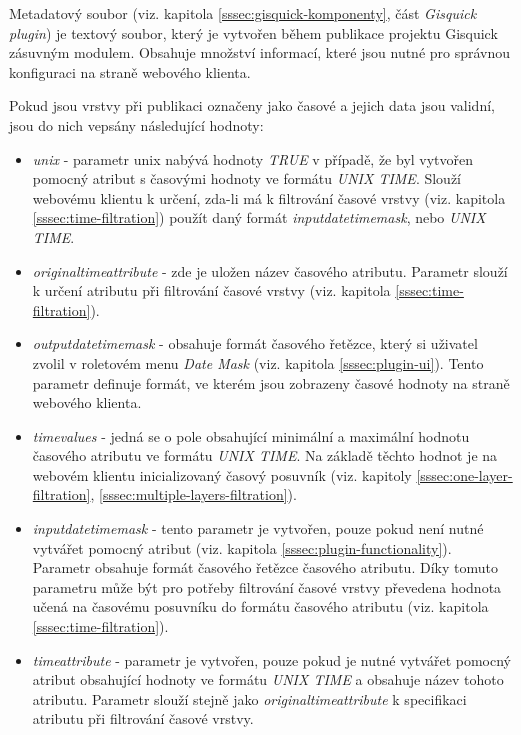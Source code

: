 Metadatový soubor (viz. kapitola \ref{sssec:gisquick-komponenty}, část
\textit{Gisquick plugin}) je textový soubor, který je vytvořen během publikace
projektu Gisquick zásuvným modulem. Obsahuje množství informací, které jsou
nutné pro správnou konfiguraci na straně webového klienta.

Pokud jsou vrstvy při publikaci označeny jako časové a jejich data jsou
validní, jsou do nich vepsány následující hodnoty:

\begin{itemize}
\item\textit{unix} - parametr unix nabývá hodnoty \textit{TRUE}
v případě, že byl vytvořen pomocný atribut s časovými
hodnoty ve formátu \textit{UNIX TIME}. Slouží webovému
klientu k určení, zda-li má k filtrování časové vrstvy
(viz. kapitola \ref{sssec:time-filtration}) použít daný formát
\textit{input\textunderscore datetime\textunderscore mask}, nebo
\textit{UNIX TIME}.
\item\textit{original\textunderscore time\textunderscore attribute}
- zde je uložen název časového atributu. Parametr slouží k
určení atributu při filtrování časové vrstvy (viz. kapitola
\ref{sssec:time-filtration}).
\item\textit{output\textunderscore datetime\textunderscore mask}
- obsahuje formát časového řetězce, který si uživatel
zvolil v roletovém menu \textit{Date Mask} (viz. kapitola
\ref{sssec:plugin-ui}). Tento parametr definuje formát, ve kterém
jsou zobrazeny časové hodnoty na straně webového klienta.
\item\textit{time\textunderscore values} - jedná se o pole
obsahující minimální a maximální hodnotu časového
atributu ve formátu \textit{UNIX TIME}. Na základě těchto
hodnot je na webovém klientu inicializovaný časový
posuvník (viz. kapitoly \ref{sssec:one-layer-filtration},
\ref{sssec:multiple-layers-filtration}).
\item\textit{input\textunderscore datetime\textunderscore mask} - tento
parametr je vytvořen, pouze pokud není nutné vytvářet pomocný
atribut (viz. kapitola \ref{sssec:plugin-functionality}). Parametr
obsahuje formát časového řetězce časového
atributu. Díky tomuto parametru může být pro potřeby filtrování
časové vrstvy převedena hodnota učená na časovému posuvníku
do formátu časového atributu (viz. kapitola
\ref{sssec:time-filtration}).
\item\textit{time\textunderscore attribute} - parametr
je vytvořen, pouze pokud je nutné vytvářet pomocný
atribut obsahující hodnoty ve formátu \textit{UNIX TIME} a
obsahuje název tohoto atributu. Parametr slouží stejně jako
\textit{original\textunderscore time\textunderscore attribute}
k specifikaci atributu při filtrování časové vrstvy.
\end{itemize}

